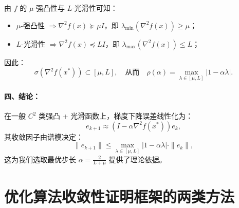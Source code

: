 由 $f$ 的 $\mu$-强凸性与 $L$-光滑性可知：

\begin{itemize}
	\item $\mu$-强凸性 $\Rightarrow \nabla^2 f(x) \succeq \mu I$，即 $\lambda_{\min}(\nabla^2 f(x)) \ge \mu$；
	\item $L$-光滑性 $\Rightarrow \nabla^2 f(x) \preceq L I$，即 $\lambda_{\max}(\nabla^2 f(x)) \le L$；
\end{itemize}

因此：
\[
\sigma(\nabla^2 f(x^*)) \subset [\mu, L],
\quad \text{从而} \quad
\rho(\alpha) = \max_{\lambda \in [\mu, L]} |1 - \alpha \lambda|.
\]

\paragraph{四、结论：}

在一般 $C^2$ 类强凸 + 光滑函数上，梯度下降误差线性化为：
\[
e_{k+1} \approx (I - \alpha \nabla^2 f(x^*)) e_k,
\]
其收敛因子由谱模决定：
\[
\|e_{k+1}\| \le \max_{\lambda \in [\mu, L]} |1 - \alpha \lambda| \cdot \|e_k\|,
\]
这为我们选取最优步长 $\alpha = \frac{2}{L + \mu}$ 提供了理论依据。

\newpage
\section{优化算法收敛性证明框架的两类方法}
